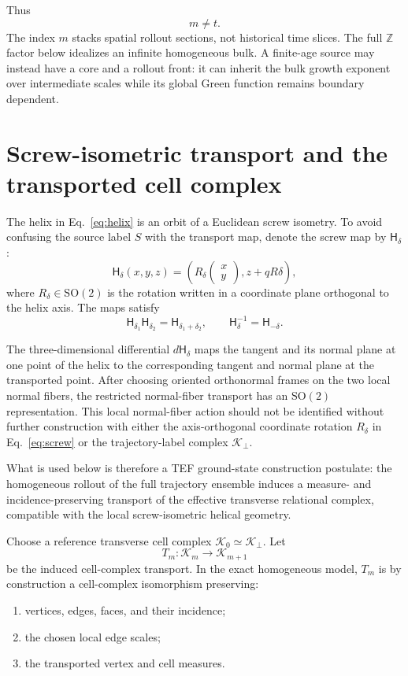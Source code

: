 \documentclass[11pt]{article}
\newcommand{\Z}{\mathbb{Z}}
\newcommand{\SO}{\mathrm{SO}}
\newcommand{\cK}{\mathcal{K}}
\begin{document}
Thus
\[
\boxed{m\neq t.}
\]
The index \(m\) stacks spatial rollout sections, not historical time slices. The full \(\Z\) factor below idealizes an infinite homogeneous bulk. A finite-age source may instead have a core and a rollout front: it can inherit the bulk growth exponent over intermediate scales while its global Green function remains boundary dependent.

\section{Screw-isometric transport and the transported cell complex}

The helix in Eq.~\eqref{eq:helix} is an orbit of a Euclidean screw isometry. To avoid confusing the source label \(S\) with the transport map, denote the screw map by \(\mathsf{H}_\delta\):
\begin{equation}
\mathsf{H}_\delta(x,y,z)
=
\left(
R_\delta
\begin{pmatrix}x\\y\end{pmatrix},
z+qR\delta
\right),
\label{eq:screw}
\end{equation}
where \(R_\delta\in\SO(2)\) is the rotation written in a coordinate plane orthogonal to the helix axis. The maps satisfy
\begin{equation}
\mathsf{H}_{\delta_1}\mathsf{H}_{\delta_2}
=
\mathsf{H}_{\delta_1+\delta_2},
\qquad
\mathsf{H}_\delta^{-1}=\mathsf{H}_{-\delta}.
\label{eq:flow}
\end{equation}

The three-dimensional differential \(d\mathsf{H}_\delta\) maps the tangent and its normal plane at one point of the helix to the corresponding tangent and normal plane at the transported point. After choosing oriented orthonormal frames on the two local normal fibers, the restricted normal-fiber transport has an \(\SO(2)\) representation. This local normal-fiber action should not be identified without further construction with either the axis-orthogonal coordinate rotation \(R_\delta\) in Eq.~\eqref{eq:screw} or the trajectory-label complex \(\cK_\perp\).

What is used below is therefore a TEF ground-state construction postulate: the homogeneous rollout of the full trajectory ensemble induces a measure- and incidence-preserving transport of the effective transverse relational complex, compatible with the local screw-isometric helical geometry.

Choose a reference transverse cell complex \(\cK_0\simeq\cK_\perp\). Let
\begin{equation}
T_m:\cK_m\rightarrow\cK_{m+1}
\end{equation}
be the induced cell-complex transport. In the exact homogeneous model, \(T_m\) is by construction a cell-complex isomorphism preserving:
\begin{enumerate}[label=(\roman*)]
\item vertices, edges, faces, and their incidence;
\item the chosen local edge scales;
\item the transported vertex and cell measures.
\end{enumerate}
\end{document}
